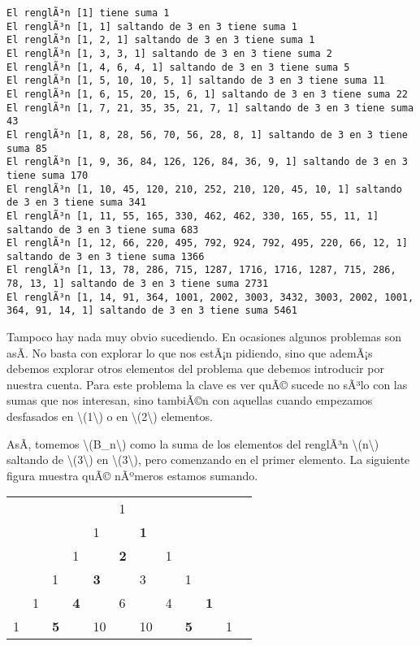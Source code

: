 \documentclass[
]{article}
\begin{document}
\begin{verbatim}
El renglÃ³n [1] tiene suma 1
El renglÃ³n [1, 1] saltando de 3 en 3 tiene suma 1
El renglÃ³n [1, 2, 1] saltando de 3 en 3 tiene suma 1
El renglÃ³n [1, 3, 3, 1] saltando de 3 en 3 tiene suma 2
El renglÃ³n [1, 4, 6, 4, 1] saltando de 3 en 3 tiene suma 5
El renglÃ³n [1, 5, 10, 10, 5, 1] saltando de 3 en 3 tiene suma 11
El renglÃ³n [1, 6, 15, 20, 15, 6, 1] saltando de 3 en 3 tiene suma 22
El renglÃ³n [1, 7, 21, 35, 35, 21, 7, 1] saltando de 3 en 3 tiene suma 43
El renglÃ³n [1, 8, 28, 56, 70, 56, 28, 8, 1] saltando de 3 en 3 tiene suma 85
El renglÃ³n [1, 9, 36, 84, 126, 126, 84, 36, 9, 1] saltando de 3 en 3 tiene suma 170
El renglÃ³n [1, 10, 45, 120, 210, 252, 210, 120, 45, 10, 1] saltando de 3 en 3 tiene suma 341
El renglÃ³n [1, 11, 55, 165, 330, 462, 462, 330, 165, 55, 11, 1] saltando de 3 en 3 tiene suma 683
El renglÃ³n [1, 12, 66, 220, 495, 792, 924, 792, 495, 220, 66, 12, 1] saltando de 3 en 3 tiene suma 1366
El renglÃ³n [1, 13, 78, 286, 715, 1287, 1716, 1716, 1287, 715, 286, 78, 13, 1] saltando de 3 en 3 tiene suma 2731
El renglÃ³n [1, 14, 91, 364, 1001, 2002, 3003, 3432, 3003, 2002, 1001, 364, 91, 14, 1] saltando de 3 en 3 tiene suma 5461
\end{verbatim}

Tampoco hay nada muy obvio sucediendo. En ocasiones algunos problemas
son asÃ­. No basta con explorar lo que nos estÃ¡n pidiendo, sino que
ademÃ¡s debemos explorar otros elementos del problema que debemos
introducir por nuestra cuenta. Para este problema la clave es ver quÃ©
sucede no sÃ³lo con las sumas que nos interesan, sino tambiÃ©n con
aquellas cuando empezamos desfasados en
{\textbackslash(1\textbackslash)} o en {\textbackslash(2\textbackslash)}
elementos.

AsÃ­, tomemos {\textbackslash(B\_n\textbackslash)} como la suma de los
elementos del renglÃ³n {\textbackslash(n\textbackslash)} saltando de
{\textbackslash(3\textbackslash)} en {\textbackslash(3\textbackslash)},
pero comenzando en el primer elemento. La siguiente figura muestra quÃ©
nÃºmeros estamos sumando.

\begin{longtable}[]{@{}llllllllllll@{}}
\toprule\noalign{}
& & & & & & & & & & & \\
\midrule\noalign{}
\endhead
\bottomrule\noalign{}
\endlastfoot
& & & & & 1 & & & & & & \\
& & & & 1 & & \textbf{1} & & & & & \\
& & & 1 & & \textbf{2} & & 1 & & & & \\
& & 1 & & \textbf{3} & & 3 & & 1 & & & \\
& 1 & & \textbf{4} & & 6 & & 4 & & \textbf{1} & & \\
1 & & \textbf{5} & & 10 & & 10 & & \textbf{5} & & 1 & \\
\end{longtable}
\end{document}
